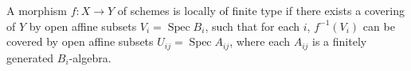 A morphism $f: X \to Y$ of schemes is locally of finite type if there exists a covering of $Y$ by open affine subsets $V_i = \operatorname{Spec} B_i$, such that for each $i$, $f^{-1}(V_i)$ can be covered by open affine subsets $U_{ij} = \operatorname{Spec} A_{ij}$, where each $A_{ij}$ is a finitely generated $B_i$-algebra.
